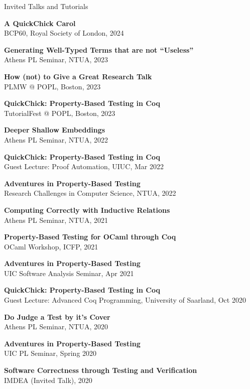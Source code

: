 \documentclass{resume} %
\begin{document}

\newcommand{\talk}[3]{
  {\bf #1} \\ %
  {#3}
  }

\newcommand{\apls}[1]{Athens PL Seminar, NTUA, #1}

\pagebreak
\begin{rSection}{Invited Talks and Tutorials}

\talk{A QuickChick Carol}
     {}
     {BCP\@60, Royal Society of London, 2024}
  
\talk{Generating Well-Typed Terms that are not ``Useless''}
     {}
     {Athens PL Seminar, NTUA, 2023}

\talk{How (not) to Give a Great Research Talk}
     {}
     {PLMW @ POPL, Boston, 2023}

\talk{QuickChick: Property-Based Testing in Coq}
     {}
     {TutorialFest @ POPL, Boston, 2023}

\talk{Deeper Shallow Embeddings}
     {}
     {Athens PL Seminar, NTUA, 2022}

\talk{QuickChick: Property-Based Testing in Coq}
     {}
     {Guest Lecture: Proof Automation, UIUC, Mar 2022}
     
\talk{Adventures in Property-Based Testing}
     {}
     {Research Challenges in Computer Science, NTUA, 2022}

\talk{Computing Correctly with Inductive Relations}
     {}
     {Athens PL Seminar, NTUA, 2021}

\talk{Property-Based Testing for OCaml through Coq}     
     {}
     {OCaml Workshop, ICFP, 2021}

\talk{Adventures in Property-Based Testing}
     {}
     {UIC Software Analysis Seminar, Apr 2021}
     
\talk{QuickChick: Property-Based Testing in Coq}
     {}
     {Guest Lecture: Advanced Coq Programming, University of Saarland, Oct 2020}
     
\talk{Do Judge a Test by it's Cover}
     {}
     {Athens PL Seminar, NTUA, 2020}
     
\talk{Adventures in Property-Based Testing}
     {}
     {UIC PL Seminar, Spring 2020}
  
\talk{Software Correctness through Testing and Verification}
     {}
     {IMDEA (Invited Talk), 2020}
  

\end{rSection}
\end{document}
